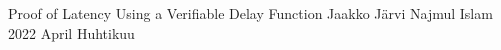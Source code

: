 \documentclass[a4paper,12pt]{report}
\begin{document}

\renewcommand{\appname}{Appendices}

{Proof of Latency Using a Verifiable Delay Function}
{Jaakko Järvi}
{Najmul Islam}
{2022}
{April}
{Huhtikuu}


\gentitle




%
%
\pagestyle{empty}


%
%
\tableofcontents
\clearpage
\setcounter{page}{0}
\listoffigures
\clearpage
\setcounter{page}{0}
\lstlistoflistings

%
%
%

\startpages
\end{document}
